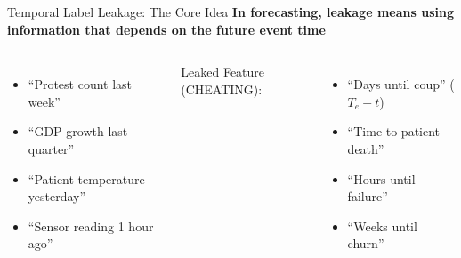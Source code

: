 \documentclass[aspectratio=169]{beamer}
\begin{document}
\begin{frame}{Temporal Label Leakage: The Core Idea}
\textbf{In forecasting, leakage means using information that depends on the future event time}

\vspace{1em}
\begin{columns}[T]
\begin{itemize}
\item ``Protest count last week''
\item ``GDP growth last quarter''
\item ``Patient temperature yesterday''
\item ``Sensor reading 1 hour ago''
\end{itemize}

\vspace{0.5em}

\alert{Leaked Feature (CHEATING):}
\begin{itemize}
\item ``Days until coup'' ($T_e - t$)
\item ``Time to patient death''
\item ``Hours until failure''
\item ``Weeks until churn''
\end{itemize}

\vspace{0.5em}
\end{columns}
\end{frame}
\end{document}

